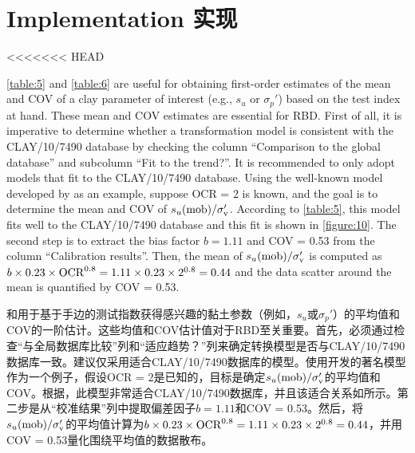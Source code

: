 \section{Implementation 实现}

<<<<<<< HEAD
\begin{paracol}{2}
    
    \autoref{table:5} and \autoref{table:6} are useful for obtaining first-order estimates of the mean and COV of a clay parameter of interest (e.g., $s_u$ or $\sigma_p'$) based on the test index at hand. These mean and COV estimates are essential for RBD. First of all, it is imperative to determine whether a transformation model is consistent with the CLAY/10/7490 database by checking the column “Comparison to the global database” and subcolumn “Fit to the trend?”. It is recommended to only adopt models that fit to the CLAY/10/7490 database. Using the well-known model developed by \citet{Jamiolkowski198557} as an example, suppose OCR = 2 is known, and the goal is to determine the mean and COV of $s_u(\rm{mob})/\sigma_v'$. According to \autoref{table:5}, this model fits well to the CLAY/10/7490 database and this fit is shown in \autoref{figure:10}. The second step is to extract the bias factor $b = 1.11$ and COV = 0.53 from the column “Calibration results”. Then, the mean of $s_u(\rm{mob})/\sigma_v'$ is computed as $b\times{}0.23\times{}\rm{OCR}^{0.8}=1.11\times{}0.23\times{}2^{0.8}=0.44$ and the data scatter around the mean is quantified by COV = 0.53.
        
    \switchcolumn
    
    和用于基于手边的测试指数获得感兴趣的黏土参数（例如，$s_u$或$\sigma_p'$）的平均值和COV的一阶估计。这些均值和COV估计值对于RBD至关重要。首先，必须通过检查“与全局数据库比较”列和“适应趋势？”列来确定转换模型是否与CLAY/10/7490数据库一致。建议仅采用适合CLAY/10/7490数据库的模型。使用\citet{Jamiolkowski198557}开发的著名模型作为一个例子，假设OCR = 2是已知的，目标是确定$s_u(\rm{mob})/\sigma_v'$的平均值和COV。根据，此模型非常适合CLAY/10/7490数据库，并且该适合关系如所示。第二步是从“校准结果”列中提取偏差因子$b = 1.11$和COV = 0.53。然后，将$s_u(\rm{mob})/\sigma_v'$的平均值计算为$b\times{}0.23\times{}\rm{OCR}^{0.8}=1.11\times{}0.23\times{}2^{0.8}=0.44$，并用COV = 0.53量化围绕平均值的数据散布。
        
    \switchcolumn*
    

\end{paracol}
